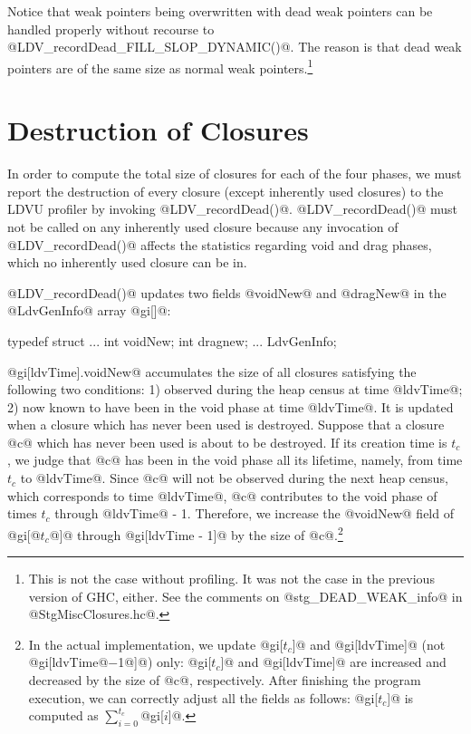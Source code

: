 \documentclass{article}
\begin{document}
Notice that weak pointers being overwritten with dead weak pointers can be handled 
properly without recourse to @LDV_recordDead_FILL_SLOP_DYNAMIC()@. The reason is 
that dead weak pointers are of the same size as normal weak 
pointers.\footnote{This is not the case without profiling. It was not the case 
in the previous version of
GHC, either. See the comments on @stg\_DEAD\_WEAK\_info@ in @StgMiscClosures.hc@.}

\section{Destruction of Closures}

In order to compute the total size of closures for each of the four phases,
we must report the destruction of every closure (except inherently used closures)
to the LDVU profiler by invoking @LDV_recordDead()@.
@LDV_recordDead()@ must not be called on any inherently used closure
because any invocation of @LDV_recordDead()@ affects the
statistics regarding void and drag phases, which no inherently used
closure can be in.

@LDV_recordDead()@ updates two fields @voidNew@ and @dragNew@ in the @LdvGenInfo@ 
array @gi[]@:

\begin{code}
typedef struct {
  ...
  int voidNew; 
  int dragnew;
  ...
} LdvGenInfo;
\end{code} 

@gi[ldvTime].voidNew@ accumulates the size of all closures satisfying the following
two conditions: 1) observed during the heap census at time @ldvTime@;
2) now known to have been in the void phase at time @ldvTime@.
It is updated when a closure which has never been used is destroyed.
Suppose that a closure @c@ which has never been used is about to be destroyed.
If its creation time is $t_c$, we judge that @c@ has been in the
void phase all its lifetime, namely, from time $t_c$ to @ldvTime@.
Since @c@ will not be observed during the next heap census, which corresponds
to time @ldvTime@, @c@ contributes to the void phase of times $t_c$ through
@ldvTime@ - 1.
Therefore, we increase the @voidNew@ field of @gi[@$t_c$@]@ through @gi[ldvTime - 1]@
by the size of @c@.\footnote{In the actual implementation, we update @gi[$t_c$]@ 
and @gi[ldvTime]@ (not @gi[ldvTime@$ - $1@]@) only: @gi[$t_c$]@ and @gi[ldvTime]@ 
are increased and decreased by the size of @c@, respectively. 
After finishing the program execution, we can correctly adjust all the fields
as follows:
@gi[$t_c$]@ is computed as $\sum_{i=0}^{t_c}$@gi[$i$]@.
}
\end{document}
